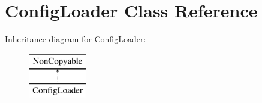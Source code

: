 \hypertarget{class_config_loader}{\section{Config\-Loader Class Reference}
\label{class_config_loader}
}
Inheritance diagram for Config\-Loader\-:\begin{figure}[H]
\begin{center}
\leavevmode
\includegraphics[height=2.000000cm]{class_config_loader}
\end{center}
\end{figure}

